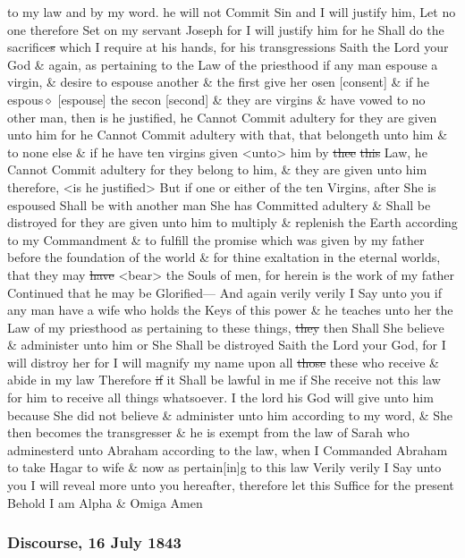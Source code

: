 to my law and by my word. he will not Commit Sin and I will justify him, Let no one therefore Set on my servant Joseph for I will justify him for he Shall do the sacrifice\sout{s} which I require at his hands, for his transgressions Saith the Lord your God \& again, as pertaining to the Law of the priesthood if any man espouse a virgin, \& desire to espouse another \& the first give her osen [consent] \& if he espous$\diamond$ [espouse] the secon [second] \& they are virgins \& have vowed to no other man, then is he justified, he Cannot Commit adultery for they are given unto him for he Cannot Commit adultery with that, that belongeth unto him \& to none else \& if he have ten virgins given <unto> him by \sout{thee} \sout{this} Law, he Cannot Commit adultery for they belong to him, \& they are given unto him therefore, <is he justified> But if one or either of the ten Virgins, after She is espoused Shall be with another man She has Committed adultery \& Shall be distroyed for they are given unto him to multiply \& replenish the Earth according to my Commandment \& to fulfill the promise which was given by my father before the foundation of the world \& for thine exaltation in the eternal worlds, that they may \sout{have} <bear> the Souls of men, for herein is the work of my father Continued that he may be Glorified--- And again verily verily I Say unto you if any man have a wife who holds the Keys of this power \& he teaches unto her the Law of my priesthood as pertaining to these things, \sout{they} then Shall She believe \& administer unto him or She Shall be distroyed Saith the Lord your God, for I will distroy her for I will magnify my name upon all \sout{those} these who receive \& abide in my law Therefore \sout{if} it Shall be lawful in me if She receive not this law for him to receive all things whatsoever. I the lord his God will give unto him because She did not believe \& administer unto him according to my word, \& She then becomes the transgresser \& he is exempt from the law of Sarah who adminesterd unto Abraham according to the law, when I Commanded Abraham to take Hagar to wife \& now as pertain[in]g to this law Verily verily I Say unto you I will reveal more unto you hereafter, therefore let this Suffice for the present Behold I am Alpha \& Omiga Amen
				
		\subsubsection{Discourse, 16 July 1843}
			\label{EMS-1843-JS-16-JUL-1843}
			

